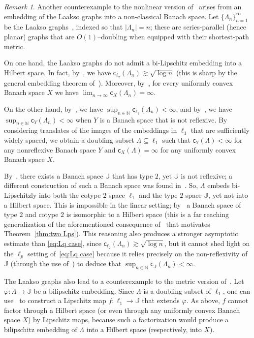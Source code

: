 \documentclass[11pt,reqno]{amsart}
\newcommand{\N}{\mathbb{N}}
\newcommand{\cc}{{\mathsf{c}}}
\newcommand{\0}{\mathbf{0}}
\renewcommand{\1}{\mathbf 1}
\newcommand{\from}{\colon}
\renewcommand{\subset}{\subseteq}
\theoremstyle{remark}
\newtheorem{remark}[thm]{Remark}
\begin{document}
\begin{remark}\label{rem:J}
  Another counterexample to the nonlinear version of~\cite{Mau74} arises from an embedding of the Laakso graphs into a non-classical Banach space.  Let $\{\Lambda_n\}_{n=1}^\infty$ be the Laakso graphs~\cite{Laa00,Laa02}, indexed so that $|\Lambda_n|=n$; these are series-parallel (hence planar) graphs that are $O(1)$--doubling when equipped with their shortest-path metric.

  On one hand, the Laakso graphs do not admit a bi-Lipschitz embedding into a Hilbert space.  In fact, by~\cite{Laa00,LP01}, we have $\cc_{\ell_2}(\Lambda_n)\gtrsim \sqrt{\log n}$ (this is sharp by the general embedding theorem of~\cite{Rao99}).  Moreover, by~\cite{MN-SOCG}, for every uniformly convex Banach space $X$ we have $\lim_{n\to \infty}\cc_X(\Lambda_n)=\infty$.

  On the other hand, by~\cite{GNRS04}, we have $\sup_{n\in \N}\cc_{\ell_1}(\Lambda_n)<\infty$, and by~\cite{JS09}, we have $\sup_{n\in \N}\cc_{Y}(\Lambda_n)<\infty$ when $Y$ is a Banach space that is not reflexive.  By considering translates of the images of the embeddings in $\ell_1$ that are sufficiently widely spaced, we obtain a doubling subset $\Lambda\subset \ell_1$ such that $\cc_Y(\Lambda)<\infty$ for any nonreflexive Banach space $Y$ and $\cc_{X}(\Lambda)=\infty$ for any uniformly convex Banach space $X$.

  By~\cite{Jam78}, there exists a Banach space $\mathbb{J}$ that has  type $2$, yet $\mathbb{J}$ is not reflexive; a different construction of such a Banach space was found in~\cite{PX87}.  So, $\Lambda$ embeds bi-Lipschitzly into both the cotype $2$ space $\ell_1$ and the type $2$ space $\mathbb{J}$, yet not into a Hilbert space.  This is impossible in the linear setting; by~\cite{Kwa72}  a Banach space of type $2$ and cotype $2$ is isomorphic to a Hilbert space (this is a far reaching generalization of the aforementioned consequence of~\cite{KP61} that motivates Theorem~\ref{thm:two Lps}).   This reasoning also produces a stronger asymptotic estimate than \eqref{eq:Lq case}, since $\cc_{\ell_2}(\Lambda_n)\gtrsim \sqrt{\log n}$, but it cannot shed light on the $\ell_p$ setting of~\eqref{eq:Lq case} because it relies precisely on the non-reflexivity of $\mathbb{J}$ (through the use of~\cite{JS09}) to deduce that $\sup_{n\in \N} \cc_{\mathbb{J}}(\Lambda_n)<\infty$.

  The Laakso graphs also lead to a counterexample to the metric version of~\cite{Mau74}.  Let $\varphi\from \Lambda\to \mathbb{J}$ be a bilipschitz embedding.  Since $\Lambda$ is a doubling subset of $\ell_1$, one can use~\cite{LN05} to construct a Lipschitz map $f\from  \ell_1\to \mathbb{J}$ that extends $\varphi$.  As above, $f$ cannot factor through a Hilbert space (or even through any uniformly convex Banach space $X$) by Lipschitz maps, because such a factorization would produce a bilipschitz embedding of $\Lambda$ into a Hilbert space (respectively, into $X$).


\end{remark}
\end{document}
